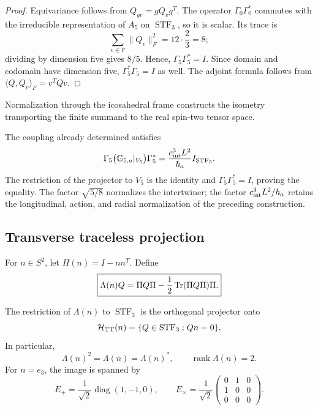 \begin{proof}
Equivariance follows from \(Q_{gv}=gQ_vg^T\). The operator
\(\Gamma_0\Gamma_0^*\) commutes with the irreducible representation of
\(A_5\) on \(\operatorname{STF}_3\), so it is scalar. Its trace
is
\[
\sum_{v\in\mathcal V}\|Q_v\|_F^2
=12\cdot\frac23=8;
\]
dividing by dimension five gives \(8/5\). Hence,
\(\Gamma_5\Gamma_5^*=I\). Since domain and codomain have dimension
five, \(\Gamma_5^*\Gamma_5=I\) as well. The adjoint formula
follows from \(\langle Q,Q_v\rangle_F=v^TQv\).
\end{proof}

Normalization through the icosahedral frame constructs the isometry
transporting the finite summand to the real spin-two tensor space.

The coupling already determined satisfies
\begin{equation}
 \Gamma_5\bigl(\mathbb G_{5,a}|_{V_5}\bigr)\Gamma_5^*
 =\frac{c_{\rm int}^3L^2}{\hbar_a}I_{\operatorname{STF}_3}.
 \label{eq:ii-g26-normalizacion-tensorial}
\end{equation}
The restriction of the projector to \(V_5\) is the identity and
\(\Gamma_5\Gamma_5^*=I\), proving the equality. The factor
\(\sqrt{5/8}\) normalizes the intertwiner; the factor
\(c_{\rm int}^3L^2/\hbar_a\) retains the longitudinal, action,
and radial normalization of the preceding construction.

\subsection{Transverse traceless projection}

For \(n\in S^2\), let \(\Pi(n)=I-nn^T\). Define
\begin{equation}
\label{ii:pent:eq:gravity-lambda-tt}
\boxed{
\Lambda(n)Q
=\Pi Q\Pi-\frac12\operatorname{Tr}(\Pi Q\Pi)\Pi.}
\end{equation}

\begin{theorem}
\label{ii:pent:thm:gravity-tt}
The restriction of \(\Lambda(n)\) to \(\operatorname{STF}_3\) is the
orthogonal projector onto
\begin{equation}
\label{ii:pent:eq:gravity-htt}
\mathcal H_{\rm TT}(n)
=\{Q\in\operatorname{STF}_3:Qn=0\}.
\end{equation}
In particular,
\begin{equation}
\label{ii:pent:eq:gravity-lambda-properties}
\Lambda(n)^2=\Lambda(n)=\Lambda(n)^*,
\qquad \operatorname{rank}\Lambda(n)=2.
\end{equation}
For \(n=e_3\), the image is spanned by
\begin{equation}
\label{ii:pent:eq:gravity-plus-cross}
E_+=\frac1{\sqrt2}\operatorname{diag}(1,-1,0),
\qquad
E_\times=\frac1{\sqrt2}
\begin{pmatrix}0&1&0\\1&0&0\\0&0&0\end{pmatrix}.
\end{equation}
\end{theorem}

